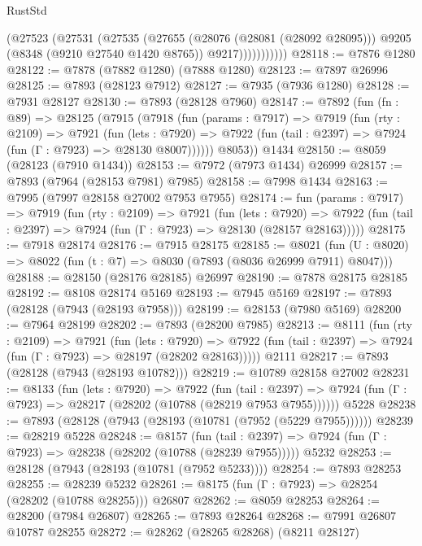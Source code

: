 \begin{lexlean}{RustStd}
\begin{coremodule}
                  (@27523
                    (@27531
                      (@27535
                        (@27655
                          (@28076 (@28081 (@28092 @28095)))
                          @9205
                          (@8348 (@9210 @27540 @1420 @8765))
                          @9217)))))))))))
@28118 := @7876 @1280
@28122 := @7878 (@7882 @1280) (@7888 @1280)
@28123 := @7897 @26996
@28125 := @7893 (@28123 @7912)
@28127 := @7935 (@7936 @1280)
@28128 := @7931 @28127
@28130 := @7893 (@28128 @7960)
@28147 := @7892
    (fun (fn : @89) =>
    @28125
      (@7915
        (@7918
          (fun (params : @7917) =>
          @7919
            (fun (rty : @2109) =>
            @7921
              (fun (lets : @7920) =>
              @7922 (fun (tail : @2397) => @7924 (fun (Γ : @7923) => @28130 @8007))))))
        @8053))
    @1434
@28150 := @8059 (@28123 (@7910 @1434))
@28153 := @7972 (@7973 @1434) @26999
@28157 := @7893 (@7964 (@28153 @7981) @7985)
@28158 := @7998 @1434
@28163 := @7995 (@7997 @28158 @27002 @7953 @7955)
@28174 := fun (params : @7917) =>
  @7919
    (fun (rty : @2109) =>
    @7921
      (fun (lets : @7920) =>
      @7922 (fun (tail : @2397) => @7924 (fun (Γ : @7923) => @28130 (@28157 @28163)))))
@28175 := @7918 @28174
@28176 := @7915 @28175
@28185 := @8021
    (fun (U : @8020) => @8022 (fun (t : @7) => @8030 (@7893 (@8036 @26999 @7911) @8047)))
@28188 := @28150 (@28176 @28185) @26997
@28190 := @7878 @28175 @28185
@28192 := @8108 @28174 @5169
@28193 := @7945 @5169
@28197 := @7893 (@28128 (@7943 (@28193 @7958)))
@28199 := @28153 (@7980 @5169)
@28200 := @7964 @28199
@28202 := @7893 (@28200 @7985)
@28213 := @8111
    (fun (rty : @2109) =>
    @7921
      (fun (lets : @7920) =>
      @7922 (fun (tail : @2397) => @7924 (fun (Γ : @7923) => @28197 (@28202 @28163)))))
    @2111
@28217 := @7893 (@28128 (@7943 (@28193 @10782)))
@28219 := @10789 @28158 @27002
@28231 := @8133
    (fun (lets : @7920) =>
    @7922
      (fun (tail : @2397) =>
      @7924 (fun (Γ : @7923) => @28217 (@28202 (@10788 (@28219 @7953 @7955))))))
    @5228
@28238 := @7893 (@28128 (@7943 (@28193 (@10781 (@7952 (@5229 @7955))))))
@28239 := @28219 @5228
@28248 := @8157
    (fun (tail : @2397) => @7924 (fun (Γ : @7923) => @28238 (@28202 (@10788 (@28239 @7955)))))
    @5232
@28253 := @28128 (@7943 (@28193 (@10781 (@7952 @5233))))
@28254 := @7893 @28253
@28255 := @28239 @5232
@28261 := @8175 (fun (Γ : @7923) => @28254 (@28202 (@10788 @28255))) @26807
@28262 := @8059 @28253
@28264 := @28200 (@7984 @26807)
@28265 := @7893 @28264
@28268 := @7991 @26807 @10787 @28255
@28272 := @28262 (@28265 @28268) (@8211 @28127)

\end{coremodule}
\end{lexlean}
